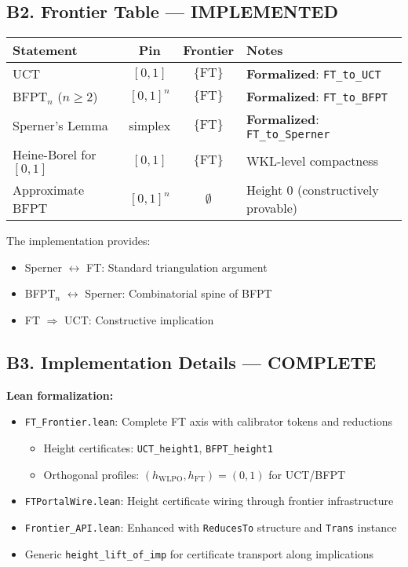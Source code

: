 \documentclass[11pt]{article}
\theoremstyle{definition}
\theoremstyle{remark}
\newcommand{\FT}{\mathrm{FT}}
\begin{document}
\subsection{B2. Frontier Table — \textbf{\color{green}IMPLEMENTED}}

\begin{center}
\begin{tabular}{l|c|c|p{5cm}}
\hline
\textbf{Statement} & \textbf{Pin} & \textbf{Frontier} & \textbf{Notes} \\
\hline
UCT & $[0,1]$ & $\{\FT\}$ & \textbf{\color{green}Formalized}: \texttt{FT\_to\_UCT} \\
BFPT$_n$ ($n \geq 2$) & $[0,1]^n$ & $\{\FT\}$ & \textbf{\color{green}Formalized}: \texttt{FT\_to\_BFPT} \\
Sperner's Lemma & simplex & $\{\FT\}$ & \textbf{\color{green}Formalized}: \texttt{FT\_to\_Sperner} \\
Heine-Borel for $[0,1]$ & $[0,1]$ & $\{\FT\}$ & WKL-level compactness \\
Approximate BFPT & $[0,1]^n$ & $\emptyset$ & Height 0 (constructively provable) \\
\hline
\end{tabular}
\end{center}

The implementation provides:
\begin{itemize}
\item Sperner $\leftrightarrow$ FT: Standard triangulation argument \cite{Fridman-Simpson}
\item BFPT$_n$ $\leftrightarrow$ Sperner: Combinatorial spine of BFPT
\item FT $\Rightarrow$ UCT: Constructive implication \cite{Ishihara-RM}
\end{itemize}

\subsection{B3. Implementation Details — \textbf{\color{green}COMPLETE}}

\textbf{Lean formalization:}
\begin{itemize}
\item \texttt{FT\_Frontier.lean}: Complete FT axis with calibrator tokens and reductions
  \begin{itemize}
  \item Height certificates: \texttt{UCT\_height1}, \texttt{BFPT\_height1}
  \item Orthogonal profiles: $(h_{\text{WLPO}}, h_{\text{FT}}) = (0, 1)$ for UCT/BFPT
  \end{itemize}
\item \texttt{FTPortalWire.lean}: Height certificate wiring through frontier infrastructure
\item \texttt{Frontier\_API.lean}: Enhanced with \texttt{ReducesTo} structure and \texttt{Trans} instance
\item Generic \texttt{height\_lift\_of\_imp} for certificate transport along implications
\end{itemize}
\end{document}
